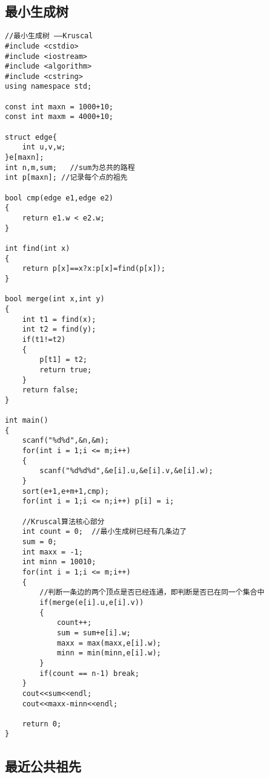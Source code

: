 \documentclass[twoside]{article}
\begin{document}
\subsection{最小生成树}
\begin{lstlisting}
//最小生成树 ——Kruscal 
#include <cstdio>
#include <iostream>
#include <algorithm>
#include <cstring>
using namespace std;

const int maxn = 1000+10;
const int maxm = 4000+10;

struct edge{
	int u,v,w;
}e[maxn];
int n,m,sum;   //sum为总共的路程 
int p[maxn]; //记录每个点的祖先 

bool cmp(edge e1,edge e2)
{
	return e1.w < e2.w;
}

int find(int x)
{
	return p[x]==x?x:p[x]=find(p[x]);
}

bool merge(int x,int y)
{
	int t1 = find(x);
	int t2 = find(y);
	if(t1!=t2)
	{
		p[t1] = t2;
		return true;
	}
	return false;
}

int main()
{
	scanf("%d%d",&n,&m);
	for(int i = 1;i <= m;i++)
	{
		scanf("%d%d%d",&e[i].u,&e[i].v,&e[i].w);
	}
	sort(e+1,e+m+1,cmp);
	for(int i = 1;i <= n;i++) p[i] = i;
	
	//Kruscal算法核心部分 
	int count = 0;  //最小生成树已经有几条边了 
	sum = 0; 
	int maxx = -1;
	int minn = 10010;
	for(int i = 1;i <= m;i++)
	{
		//判断一条边的两个顶点是否已经连通，即判断是否已在同一个集合中
		if(merge(e[i].u,e[i].v))
		{
			count++;
			sum = sum+e[i].w;
			maxx = max(maxx,e[i].w);
			minn = min(minn,e[i].w);	
		} 
		if(count == n-1) break;
	}
	cout<<sum<<endl;
	cout<<maxx-minn<<endl;
	
	return 0;	
} \end{lstlisting}
\subsection{最近公共祖先}
\end{document}
